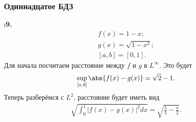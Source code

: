 \subsubsection{Одиннадцатое БДЗ}

\setcounter{iii}{25}


\i \textbf{9.}
\begin{gather*}
    f(x) = 1 - x;\\
    g(x) = \sqrt{1-x^2};\\
    [a, b] = [0, 1].
\end{gather*}
Для начала посчитаем расстояние между $f$ и $g$ в $L^\infty$. Это будет 
\begin{gather*}
    \sup_{[a,b]}\abs{f(x) - g(x)} = \sqrt{2} - 1.
\end{gather*}
Теперь разберёмся с $L^2$, расстояние будет иметь вид
\begin{gather*}
    \sqrt{\int_0^1|f(x) - g(x)|^2dx} = \sqrt{\frac{5}{3} - \frac{\pi}{2}}.
\end{gather*}



